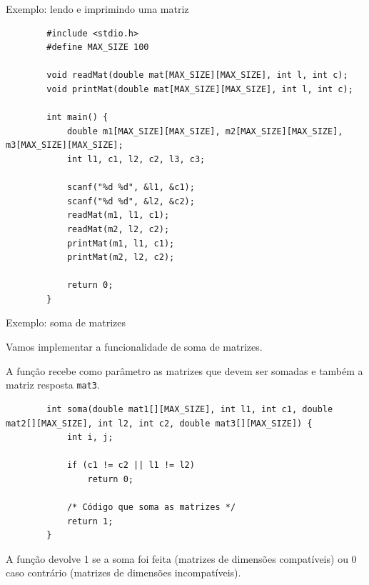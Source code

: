 \documentclass[handout]{beamer}
\newcommand{\cod}[1]{\texttt{#1}}
\begin{document}
\begin{frame}[fragile]{Exemplo: lendo e imprimindo uma matriz}

    \begin{verbatim}
        #include <stdio.h>
        #define MAX_SIZE 100

        void readMat(double mat[MAX_SIZE][MAX_SIZE], int l, int c);
        void printMat(double mat[MAX_SIZE][MAX_SIZE], int l, int c);

        int main() {
            double m1[MAX_SIZE][MAX_SIZE], m2[MAX_SIZE][MAX_SIZE], m3[MAX_SIZE][MAX_SIZE];
            int l1, c1, l2, c2, l3, c3;

            scanf("%d %d", &l1, &c1);
            scanf("%d %d", &l2, &c2);
            readMat(m1, l1, c1);
            readMat(m2, l2, c2);
            printMat(m1, l1, c1);
            printMat(m2, l2, c2);

            return 0;
        }
    \end{verbatim}

\end{frame}

\begin{frame}[fragile]{Exemplo: soma de matrizes}

    \small
    Vamos implementar a funcionalidade de soma de matrizes.

    A função recebe como parâmetro as matrizes que devem ser somadas e também a matriz resposta \cod{mat3}.

    \begin{verbatim}
        int soma(double mat1[][MAX_SIZE], int l1, int c1, double mat2[][MAX_SIZE], int l2, int c2, double mat3[][MAX_SIZE]) {
            int i, j;

            if (c1 != c2 || l1 != l2)
                return 0;

            /* Código que soma as matrizes */
            return 1;
        }
    \end{verbatim}
        
    A função devolve 1 se a soma foi feita (matrizes de dimensões compatíveis) ou 0 caso contrário (matrizes de dimensões incompatíveis).

\end{frame}
\end{document}
